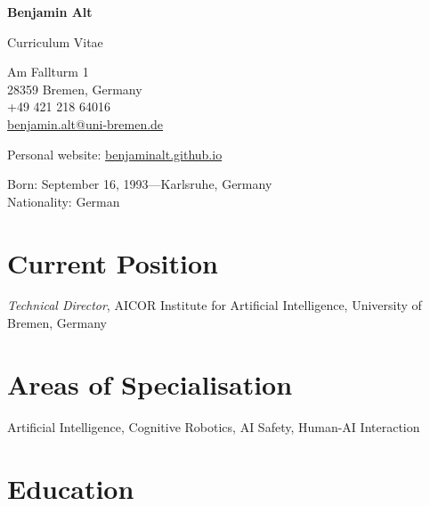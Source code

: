 \documentclass[11pt]{article} %
\begin{document}

{\LARGE\bfseries Benjamin Alt}

\bigskip

Curriculum Vitae

\bigskip\medskip %

\begin{minipage}{.5\textwidth}
Am Fallturm 1\\
28359 Bremen, Germany\\
+49 421 218 64016\\
\href{mailto:benjamin.alt@uni-bremen.de}{benjamin.alt@uni-bremen.de}
\end{minipage}%

\medskip %

Personal website: \href{https://benjaminalt.github.io}{benjaminalt.github.io} %

\medskip %

Born: September 16, 1993---Karlsruhe, Germany\\ %
Nationality: German %


\section*{Current Position}

\emph{Technical Director}, AICOR Institute for Artificial Intelligence, University of Bremen, Germany %


\section*{Areas of Specialisation}

Artificial Intelligence, Cognitive Robotics, AI Safety, Human-AI Interaction %


\section*{Education}
\end{document}
